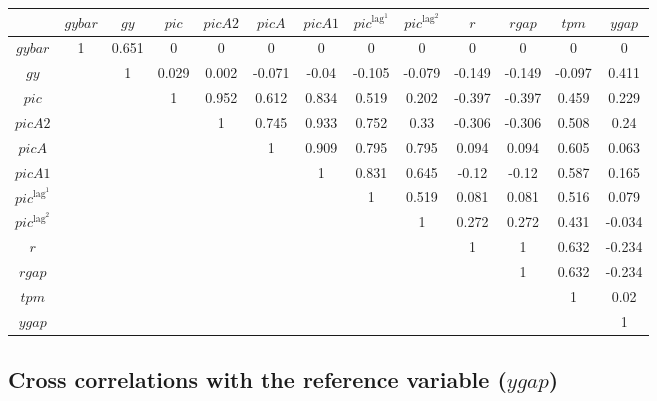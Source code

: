 \begin{tabular}{c|cccccccccccc|}
  & ${g\!y\!b\!a\!r}$ & ${g\!y}$ & ${p\!i\!c}$ & ${p\!i\!c\!A\!2}$ & ${p\!i\!c\!A}$ & ${p\!i\!c\!A\!1}$ & ${p\!i\!c}^{\mathrm{lag}^{\mathrm{1}}}$ & ${p\!i\!c}^{\mathrm{lag}^{\mathrm{2}}}$ & $r$ & ${r\!g\!a\!p}$ & ${t\!p\!m}$ & ${y\!g\!a\!p}$\\
\hline
${g\!y\!b\!a\!r}$ & 1 & 0.651 & 0 & 0 & 0 & 0 & 0 & 0 & 0 & 0 & 0 & 0 \\
${g\!y}$ &  & 1 & 0.029 & 0.002 & -0.071 & -0.04 & -0.105 & -0.079 & -0.149 & -0.149 & -0.097 & 0.411 \\
${p\!i\!c}$ &  &  & 1 & 0.952 & 0.612 & 0.834 & 0.519 & 0.202 & -0.397 & -0.397 & 0.459 & 0.229 \\
${p\!i\!c\!A\!2}$ &  &  &  & 1 & 0.745 & 0.933 & 0.752 & 0.33 & -0.306 & -0.306 & 0.508 & 0.24 \\
${p\!i\!c\!A}$ &  &  &  &  & 1 & 0.909 & 0.795 & 0.795 & 0.094 & 0.094 & 0.605 & 0.063 \\
${p\!i\!c\!A\!1}$ &  &  &  &  &  & 1 & 0.831 & 0.645 & -0.12 & -0.12 & 0.587 & 0.165 \\
${p\!i\!c}^{\mathrm{lag}^{\mathrm{1}}}$ &  &  &  &  &  &  & 1 & 0.519 & 0.081 & 0.081 & 0.516 & 0.079 \\
${p\!i\!c}^{\mathrm{lag}^{\mathrm{2}}}$ &  &  &  &  &  &  &  & 1 & 0.272 & 0.272 & 0.431 & -0.034 \\
$r$ &  &  &  &  &  &  &  &  & 1 & 1 & 0.632 & -0.234 \\
${r\!g\!a\!p}$ &  &  &  &  &  &  &  &  &  & 1 & 0.632 & -0.234 \\
${t\!p\!m}$ &  &  &  &  &  &  &  &  &  &  & 1 & 0.02 \\
${y\!g\!a\!p}$ &  &  &  &  &  &  &  &  &  &  &  & 1 \\
\hline
\end{tabular}


\subsection{Cross correlations with the reference variable (${y\!g\!a\!p}$)}


